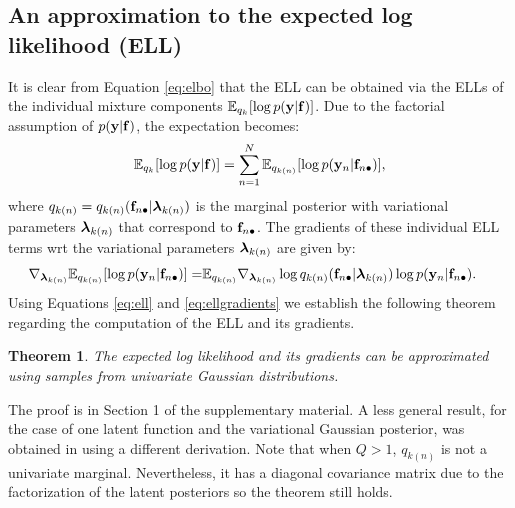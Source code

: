 \subsection{An approximation to the expected log likelihood (ELL) \label{sec:ellapprox}}
\newcommand{\lamk}{\llambda_{k}}
\newcommand{\lamkn}{\llambda_{k(n)}}
\newcommand{\lamki}{\llambda_{k(i)}}
\newcommand{\efi}{\f_{(i)}}
\newcommand{\gradkn}{\nabla_{\lamkn} \log q_{k(n)} (\fn | \lamkn)}
It is clear from Equation \eqref{eq:elbo} that the ELL can be obtained via the ELLs of the 
individual mixture components $\mathbb{E}_{q_k}  [\log p(\mathbf{y} | \mathbf{f})]$.
Due to the factorial assumption of $p(\mathbf{y} | \mathbf{f})$, the expectation becomes:
\begin{align}
\mathbb{E}_{q_k} [\log p(\mathbf{y} | \mathbf{f})] = \sum_{n=1}^N \mathbb{E}_{q_{k(n)}} [\log p(\mathbf{y}_n | \mathbf{f}_{n \bullet})],
\label{eq:ell}
\end{align}
where $q_{k(n)} = q_{k(n)}(\fn | \lamkn)$ is the marginal posterior with variational parameters $\lamkn$ that correspond to $\mathbf{f}_{n \bullet}$.
The gradients of these individual ELL terms wrt the variational parameters $\lamkn$ are given by:
\begin{align}
\nabla_{\lamkn}  \expectation_{q_{k(n)}} [\log p(\y_n | \fn)]
= & \expectation_{q_{k(n)}} \gradkn \log p(\y_n | \fn).
\label{eq:ellgradients}
\end{align}
%
Using Equations \eqref{eq:ell} and \eqref{eq:ellgradients} we establish the following theorem regarding the 
computation of the ELL and its gradients.
\newtheorem{theorem1}{Theorem}
\begin{theorem1}
The expected log likelihood and its gradients can be approximated using samples from univariate Gaussian distributions.
\end{theorem1}
%
The proof is in Section 1 of the supplementary material. 
A less general result, for the case of one latent function and the variational Gaussian posterior, was obtained in \cite{opper-arch-nc-2009} using a different derivation. 
Note that when $Q > 1$, $q_{k(n)}$ is not a univariate marginal. Nevertheless, it has a diagonal covariance matrix due to the factorization of the latent posteriors so the theorem still holds.

